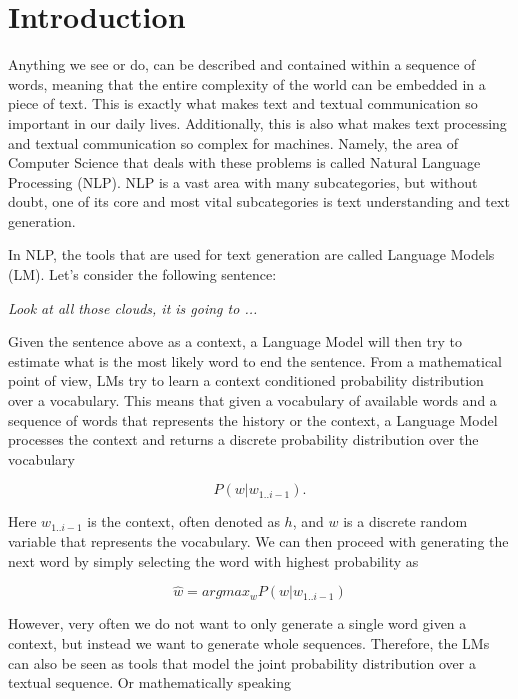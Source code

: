 \chapter{Introduction}
\label{chapter:introduction}

Anything we see or do, can be described and contained within a sequence of words, meaning that the entire complexity of the world can be embedded in a piece of text. This is exactly what makes text and textual communication so important in our daily lives. Additionally, this is also what makes text processing and textual communication so complex for machines. Namely, the area of Computer Science that deals with these problems is called Natural Language Processing (NLP). NLP is a vast area with many subcategories, but without doubt, one of its core and most vital subcategories is text understanding and text generation.

In NLP, the tools that are used for text generation are called Language Models (LM). Let's consider the following sentence:

\begin{center}
    \emph{Look at all those clouds, it is going to ...}
\end{center}

Given the sentence above as a context, a Language Model will then try to estimate what is the most likely word to end the sentence. From a mathematical point of view, LMs try to learn a context conditioned probability distribution over a vocabulary. This means that given a vocabulary of available words and a sequence of words that represents the history or the context, a Language Model processes the context and returns a discrete probability distribution over the vocabulary

\begin{displaymath}
    P(w | w_{1..i-1}).
\end{displaymath}

Here $w_{1..i-1}$ is the context, often denoted as $ h $, and $ w $ is a discrete random variable that represents the vocabulary. We can then proceed with generating the next word by simply selecting the word with highest probability as

\begin{displaymath}
    \hat{w} = argmax_w P(w | w_{1..i-1})
\end{displaymath}

However, very often we do not want to only generate a single word given a context, but instead we want to generate whole sequences. Therefore, the LMs can also be seen as tools that model the joint probability distribution over a textual sequence. Or mathematically speaking

